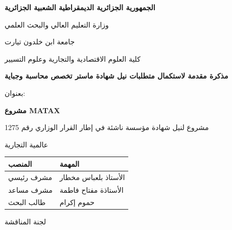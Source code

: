 \documentclass[12pt, a4paper, twoside]{report}
\begin{document}
\begin{titlepage}
\begin{center}

\vspace*{2cm}

{\Large \textbf{الجمهورية الجزائرية الديمقراطية الشعبية الجزائرية}}

\vspace{0.5cm}

{\large وزارة التعليم العالي والبحث العلمي}

\vspace{0.5cm}

{\large جامعة ابن خلدون تيارت}

\vspace{0.5cm}

{\large كلية العلوم الاقتصادية والتجارية وعلوم التسيير}

\vspace{2cm}

{\Large \textbf{مذكرة مقدمة لاستكمال متطلبات نيل شهادة ماستر تخصص محاسبة وجباية}}

\vspace{1cm}

{\large بعنوان:}

\vspace{0.5cm}

{\LARGE \textbf{مشروع MATAX}}

\vspace{0.5cm}

{\large مشروع لنيل شهادة مؤسسة ناشئة في إطار القرار الوزاري رقم 1275}

\vspace{2cm}

{\large عالمية التجارية}

\vspace{2cm}

\begin{tabular}{|l|l|}
\hline
\textbf{المنصب} & \textbf{المهمة} \\
\hline
مشرف رئيسي & الأستاذ بلعباس مخطار \\
\hline
مشرف مساعد & الأستاذة مفتاح فاطمة \\
\hline
طالب البحث & حموم إكرام \\
\hline
\end{tabular}

\vspace{2cm}

{\large لجنة المناقشة}

\vspace{0.5cm}


\end{center}
\end{titlepage}
\end{document}

